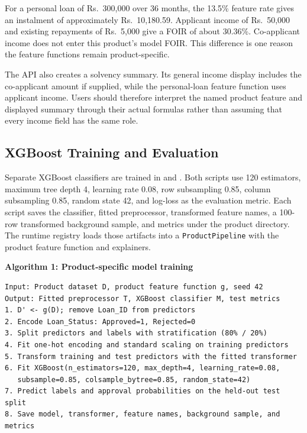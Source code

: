 For a personal loan of Rs.~300,000 over 36 months, the 13.5\% feature rate gives an instalment of approximately Rs.~10,180.59. Applicant income of Rs.~50,000 and existing repayments of Rs.~5,000 give a FOIR of about 30.36\%. Co-applicant income does not enter this product's model FOIR. This difference is one reason the feature functions remain product-specific.

The API also creates a solvency summary. Its general income display includes the co-applicant amount if supplied, while the personal-loan feature function uses applicant income. Users should therefore interpret the named product feature and displayed summary through their actual formulas rather than assuming that every income field has the same role.

\subsection{XGBoost Training and Evaluation}
Separate XGBoost classifiers are trained in  and . Both scripts use 120 estimators, maximum tree depth 4, learning rate 0.08, row subsampling 0.85, column subsampling 0.85, random state 42, and log-loss as the evaluation metric. Each script saves the classifier, fitted preprocessor, transformed feature names, a 100-row transformed background sample, and metrics under the product directory. The runtime registry loads those artifacts into a \texttt{ProductPipeline} with the product feature function and explainers.

\noindent\begin{minipage}{\textwidth}
\textbf{Algorithm 1: Product-specific model training}\par\smallskip
\begin{lstlisting}
Input: Product dataset D, product feature function g, seed 42
Output: Fitted preprocessor T, XGBoost classifier M, test metrics
1. D' <- g(D); remove Loan_ID from predictors
2. Encode Loan_Status: Approved=1, Rejected=0
3. Split predictors and labels with stratification (80% / 20%)
4. Fit one-hot encoding and standard scaling on training predictors
5. Transform training and test predictors with the fitted transformer
6. Fit XGBoost(n_estimators=120, max_depth=4, learning_rate=0.08,
   subsample=0.85, colsample_bytree=0.85, random_state=42)
7. Predict labels and approval probabilities on the held-out test split
8. Save model, transformer, feature names, background sample, and metrics
\end{lstlisting}
\end{minipage}\par\medskip

